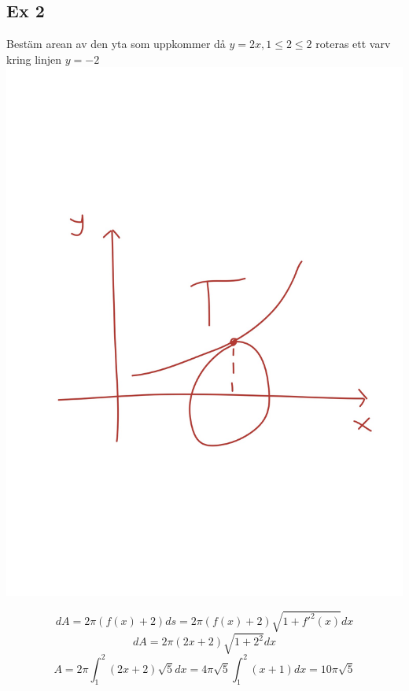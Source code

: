 \documentclass{article}
\begin{document}
\subsection{Ex 2}
Bestäm arean av den yta som uppkommer då
$ y=2x, 1\le 2\le 2 $ roteras ett varv kring linjen $y=-2$
\includegraphics[scale=0.15]{img/img6.jpg}

$$ dA = 2\pi (f(x) + 2) ds = 2\pi (f(x) + 2) \sqrt{1+f'^2(x)} dx $$
$$ dA = 2\pi(2x+2)\sqrt{1+2^2} dx $$
$$ A=2\pi\int^2_1{(2x+2)\sqrt 5 dx} = 4\pi\sqrt 5\int^2_1{(x+1)dx} = 10\pi\sqrt 5 $$
\end{document}
